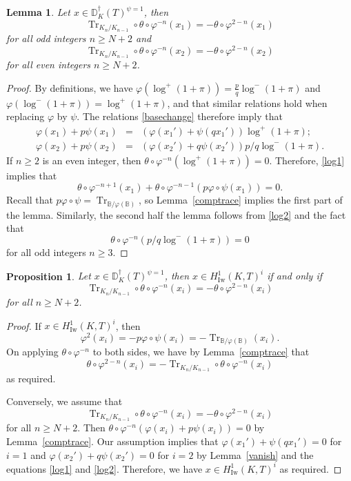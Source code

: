 \documentclass{amsart}
\newcommand{\BB}{\mathbb B}
\newcommand{\DD}{\mathbb D}
\DeclareMathOperator{\Tr}{Tr}
\DeclareMathOperator{\Iw}{Iw}
\newcommand{\vp}{\varphi}
\newtheorem{proposition}[theorem]{Proposition}
\newtheorem{lemma}[theorem]{Lemma}
\begin{document}
  \begin{lemma}\label{triv0}
   Let $x\in \DD^\dagger_K(T)^{\psi=1}$, then
   \[\Tr_{K_n/K_{n-1}}\circ\theta\circ\vp^{-n}(x_1)=-\theta\circ\vp^{2-n}(x_1)\]
   for all odd integers $n\ge N+2$ and
   \[\Tr_{K_n/K_{n-1}}\circ\theta\circ\vp^{-n}(x_2)=-\theta\circ\vp^{2-n}(x_2)\]
   for all even integers $n\ge N+2$.
  \end{lemma}
  \begin{proof}
   By definitions, we have $\vp(\log^+(1+\pi))=\frac{p}{q}\log^-(1+\pi)$ and $\vp(\log^-(1+\pi))=\log^+(1+\pi)$, and that similar relations hold when replacing $\vp$ by $\psi$. The relations \eqref{basechange} therefore imply that
   \begin{eqnarray}
    \vp(x_1)+p\psi(x_1)&=&\left(\vp(x_1')+\psi(qx_1')\right)\log^+(1+\pi);\label{log1}\\
    \vp(x_2)+p\psi(x_2)&=&\left(\vp(x_2')+q\psi(x_2')\right)p/q\log^-(1+\pi).\label{log2}
   \end{eqnarray}
   If $n\ge 2$ is an even integer, then $\theta\circ\vp^{-n}\left(\log^+(1+\pi)\right)=0$. Therefore, \eqref{log1} implies that
   \[
   \theta\circ\vp^{-n+1}(x_1)+\theta\circ\vp^{-n-1}\left(p\vp\circ\psi(x_1)\right)=0.
   \] 
   Recall that $p\vp\circ\psi=\Tr_{\BB/\vp(\BB)}$, so Lemma~\ref{comptrace} implies the first part of the lemma. Similarly, the second half the lemma follows from \eqref{log2} and the fact that 
   \[\theta\circ\vp^{-n}\left(p/q\log^-(1+\pi)\right)=0\]
   for all odd integers $n\ge 3$.
  \end{proof}

  \begin{proposition}\label{des1}
   Let $x\in \DD^\dagger_K(T)^{\psi=1}$, then $x\in H^1_{\Iw}(K,T)^i$ if and only if
   \[\Tr_{K_n/K_{n-1}}\circ\theta\circ\vp^{-n}(x_i)=-\theta\circ\vp^{2-n}(x_i)\]
   for all $n\ge N+2$. 
  \end{proposition}
  \begin{proof}
   If $x\in H^1_{\Iw}(K,T)^i$, then 
   \[
   \vp^2(x_i)=-p\vp\circ\psi(x_i)=-\Tr_{\BB/\vp(\BB)}(x_i).
   \]
   On applying $\theta\circ\vp^{-n}$ to both sides, we have by Lemma~\ref{comptrace} that
   \[
   \theta\circ\vp^{2-n}(x_i)=-\Tr_{K_n/K_{n-1}}\circ\theta\circ\vp^{-n}(x_i)
   \]
   as required.

   Conversely, we assume that 
   \[
   \Tr_{K_n/K_{n-1}}\circ\theta\circ\vp^{-n}(x_i)=-\theta\circ\vp^{2-n}(x_i)
   \]
   for all $n\ge N+2$. Then $\theta\circ\vp^{-n}\left(\vp(x_i)+p\psi(x_i)\right)=0$ by Lemma~\ref{comptrace}. Our assumption implies that $\vp(x_1')+\psi(qx_1')=0$ for $i=1$ and $\vp(x_2')+q\psi(x_2')=0$ for $i=2$ by Lemma~\ref{vanish} and the equations \eqref{log1} and \eqref{log2}. Therefore, we have $x\in H^1_{\Iw}(K,T)^i$ as required.
  \end{proof}
\end{document}
